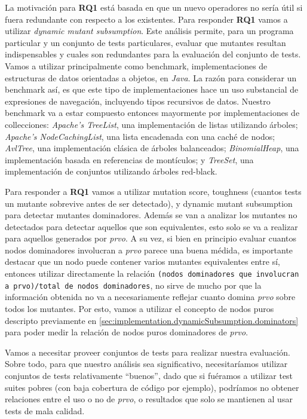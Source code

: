 La motivaci\'on para \textbf{RQ1} est\'a basada en que un nuevo operadores no ser\'ia \'util si fuera redundante con respecto a los existentes. Para responder \textbf{RQ1} vamos a utilizar \emph{dynamic mutant subsumption}. Este an\'alisis permite, para un programa particular y un conjunto de tests particulares, evaluar que mutantes resultan indispensables y cuales son redundantes para la evaluaci\'on del conjunto de tests. Vamos a utilizar principalmente como benchmark, implementaciones de estructuras de datos orientadas a objetos, en \emph{Java}. La raz\'on para considerar un benchmark as\'i, es que este tipo de implementaciones hace un uso substancial de expresiones de navegaci\'on, incluyendo tipos recursivos de datos. Nuestro benchmark va a estar compuesto entonces mayormente por implementaciones de collecciones:  \emph{Apache's TreeList}, una implementaci\'on de listas utilizando \'arboles; \emph{Apache's NodeCachingList}, una lista encadenada con una cach\'e de nodos; \emph{AvlTree}, una implementaci\'on cl\'asica de \'arboles balanceados; \emph{BinomialHeap}, una implementaci\'on basada en referencias de mont\'iculos; y \emph{TreeSet}, una implementaci\'on de conjuntos utilizando \'arboles red-black. %

Para responder a \textbf{RQ1} vamos a utilizar mutation score, toughness (cuantos tests un mutante sobrevive antes de ser detectado), y dynamic mutant subsumption para detectar mutantes dominadores. Adem\'as se van a analizar los mutantes no detectados para detectar aquellos que son equivalentes, esto solo se va a realizar para aquellos generados por \emph{prvo}. A su vez, si bien en principio evaluar cuantos nodos dominadores involucran a \emph{prvo} parece una buena m\'edida, es importante destacar que un nodo puede contener varios mutantes equivalentes entre s\'i, entonces utilizar directamente la relaci\'on \texttt{(nodos dominadores que involucran a prvo)/total de nodos dominadores}, no sirve de mucho por que la informaci\'on obtenida no va a necesariamente reflejar cuanto domina \emph{prvo} sobre todos los mutantes. Por esto, vamos a utilizar el concepto de nodos puros descripto previamente en \ref{sec:implementation.dynamicSubsumption.dominators} para poder medir la relaci\'on de nodos puros dominadores de \emph{prvo}.

Vamos a necesitar proveer conjuntos de tests para realizar nuestra evaluaci\'on. Sobre todo, para que nuestro an\'alisis sea significativo, necesitar\'iamos utilizar conjuntos de tests relativamente ``buenos'', dado que si fu\'eramos a utilizar test suites pobres (con baja cobertura de c\'odigo por ejemplo), podr\'iamos no obtener relaciones entre el uso o no de \emph{prvo}, o resultados que solo se mantienen al usar tests de mala calidad.

